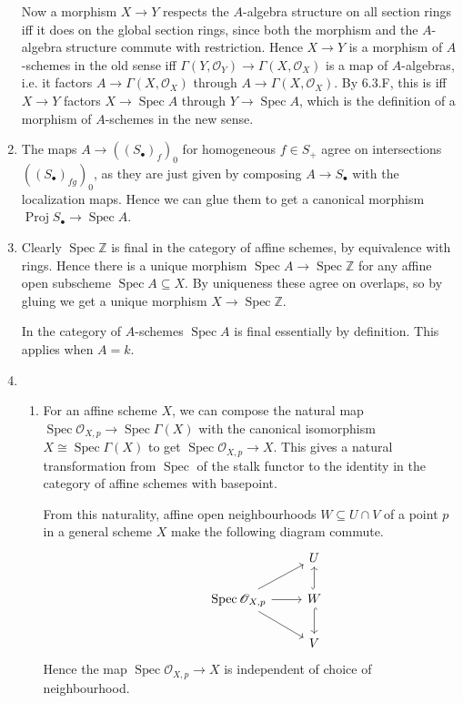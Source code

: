 \documentclass{report}
\renewcommand{\O}{\mathscr{O}} %
\newcommand{\Z}{\mathbb{Z}}
\DeclareMathOperator{\Spec}{Spec}
\DeclareMathOperator{\Proj}{Proj}
\begin{document}
\begin{enumerate}[label=\textbf{6.3.\Alph*.}]
	      Now a morphism $X\to Y$ respects the $A$-algebra structure on all
	      section rings iff it does on the global section rings, since both the
	      morphism and the $A$-algebra structure commute with restriction. Hence
	      $X\to Y$ is a morphism of $A$-schemes in the old sense iff
	      $\Gamma(Y,\O_Y)\to\Gamma(X,\O_X)$ is a map of $A$-algebras, i.e. it
	      factors $A\to\Gamma(X,\O_X)$ through $A\to\Gamma(X,\O_X)$. By 6.3.F,
	      this is iff $X\to Y$ factors $X\to\Spec A$ through $Y\to\Spec A$, which
	      is the definition of a morphism of $A$-schemes in the new sense.

	\item The maps $A\to((S_\bullet)_f)_0$ for homogeneous $f\in S_+$ agree on
	      intersections $((S_\bullet)_{fg})_0$, as they are just given by
	      composing $A\to S_\bullet$ with the localization maps. Hence we can glue
	      them to get a canonical morphism $\Proj S_\bullet\to\Spec A$.

	\item Clearly $\Spec\Z$ is final in the category of affine schemes, by
	      equivalence with rings. Hence there is a unique morphism
	      $\Spec A\to\Spec\Z$ for any affine open subscheme $\Spec A\subseteq X$.
	      By uniqueness these agree on overlaps, so by gluing we get a unique
	      morphism $X\to\Spec\Z$.

	      In the category of $A$-schemes $\Spec A$ is final essentially by
	      definition. This applies when $A=k$.

	\item
	      \begin{enumerate}[label=(\alph*)]
		      \item For an affine scheme $X$, we can compose the natural map
		            $\Spec\O_{X,p}\to\Spec\Gamma(X)$ with the canonical
		            isomorphism $X\cong\Spec\Gamma(X)$ to get $\Spec\O_{X,p}\to X$.
		            This gives a natural transformation from $\Spec$ of the stalk
		            functor to the identity in the category of affine schemes with
		            basepoint.

		            From this naturality, affine open neighbourhoods
		            $W\subseteq U\cap V$ of a point $p$ in a general scheme $X$
		            make the following diagram commute.
		            \begin{equation*}
			            \begin{tikzcd}
				            & &U \\
				            &\Spec\O_{X,p} \arrow{r} \arrow{ur} \arrow{dr}
				            &W \arrow[hook]{u} \arrow[hook]{d} \\
				            & &V
			            \end{tikzcd}
		            \end{equation*}
		            Hence the map $\Spec\O_{X,p}\to X$ is independent of choice of
		            neighbourhood.


\end{enumerate}
\end{enumerate}
\end{document}
